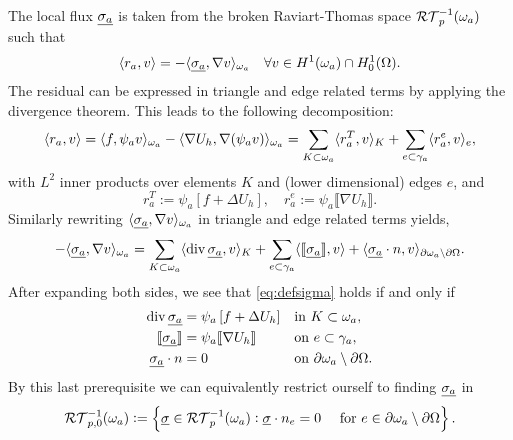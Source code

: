 \documentclass[thesis.tex]{subfiles}
\begin{document}
The local flux $\underline{\sigma_a}$ is taken from the broken Raviart-Thomas space $\mathcal{RT}_{p}^{-1}(\omega_a)$ such that
\begin{equation}
  \label{eq:defsigma}
  \langle r_a, v \rangle = - \langle \underline{\sigma_a}, \nabla v \rangle_{\omega_a} \quad \forall v \in H^1(\omega_a) \cap H_0^1(\Omega).
\end{equation}
The residual can be expressed in triangle and edge related terms by applying the divergence theorem.
This leads to the following decomposition:
\begin{equation}
  \label{eq:locdecomp}
  \langle r_a,v \rangle = \langle f, \psi_a v \rangle_{\omega_a} - \langle \nabla U_h, \nabla (\psi_av) \rangle_{\omega_a} = \sum_{ K\subset \omega_a} \langle{r^T_a, v}\rangle_K + \sum_{ e \subset \gamma_a} \langle r^e_a, v \rangle_e,
\end{equation}
with $L^2$ inner products over elements $K$ and (lower dimensional) edges $e$, and
\[
  r^T_a := \psi_a \left[ f + \Delta U_h \right], \quad r^e_a := \psi_a \llbracket \nabla U_h \rrbracket.
\]
Similarly rewriting $\langle \underline{\sigma_a}, \nabla v \rangle_{\omega_a}$ in triangle and edge related terms yields,
\[
  -\langle \underline{\sigma_a}, \nabla v \rangle_{\omega_a} = \sum_{K \subset \omega_a} \langle \operatorname{div} \underline{\sigma_a}, v \rangle_K + \sum_{ e\subset \gamma_a} \langle \llbracket \underline{\sigma_a}\rrbracket, v \rangle + \langle \underline{\sigma_a}\cdot n, v \rangle_{\partial \omega_a \setminus \partial \Omega}.
\]
After expanding both sides, we see that \eqref{eq:defsigma} holds if and only if
\begin{equation}
  \label{eq:sigmacons}
  \begin{alignedat}{3}
    \operatorname{div} \underline{\sigma_a} &= \psi_a \left [f + \Delta U_h\right] && \quad\text{in }  K\subset \omega_a ,\\
    \llbracket \underline{\sigma_a} \rrbracket &= \psi_a \llbracket \nabla U_h \rrbracket && \quad \text{on } e \subset \gamma_a,\\
    \underline{\sigma_a} \cdot n &= 0 &&\quad \text{on } \partial \omega_a \setminus \partial \Omega.
  \end{alignedat}
\end{equation}
By this last prerequisite we can equivalently restrict ourself to finding $\underline{\sigma_a}$ in
\[
  \mathcal{RT}_{p,0}^{-1}(\omega_a) := \set{ \underline{\sigma} \in \mathcal{RT}_p^{-1}(\omega_a) : \underline{\sigma} \cdot n_e = 0 \quad \text{ for } e \in \partial \omega_a \setminus \partial \Omega}.
\]
\end{document}
